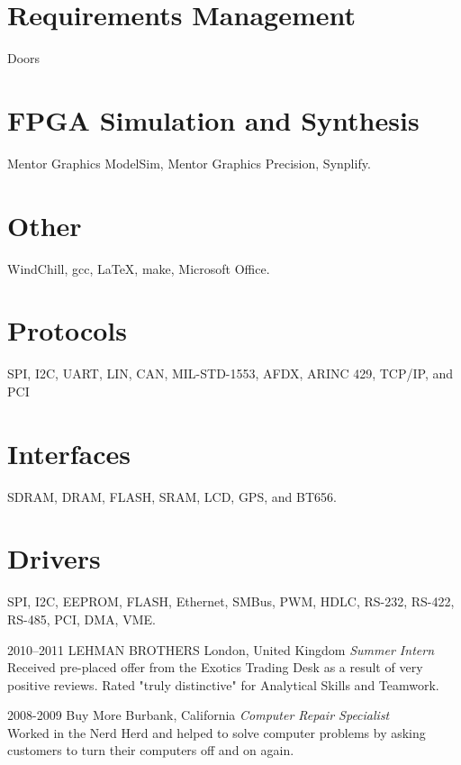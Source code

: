\documentclass[print]{template/friggeri-cv} %
\begin{document}
\begin{aside2} %
\section{Requirements Management}
Doors
\section{FPGA Simulation and Synthesis}
Mentor Graphics ModelSim, Mentor Graphics Precision, Synplify.
\section{Other}
WindChill, gcc, LaTeX, make, Microsoft Office.
\section{Protocols}
SPI, I2C, UART, LIN, CAN, MIL-STD-1553, AFDX, ARINC 429, TCP/IP, and PCI
\section{Interfaces}
SDRAM, DRAM, FLASH, SRAM, LCD, GPS, and BT656.
\section{Drivers}
SPI, I2C, EEPROM, FLASH, Ethernet, SMBus, PWM, HDLC, RS-232, RS-422, RS-485, PCI, DMA, VME.
\end{aside2}

\begin{entrylist}

\entry
{2010--2011}
{LEHMAN BROTHERS}
{London, United Kingdom}
{\emph{Summer Intern} \\
Received pre-placed offer from the Exotics Trading Desk as a result of very positive reviews. Rated "truly distinctive" for Analytical Skills and Teamwork.}


\entry
{2008-2009}
{Buy More}
{Burbank, California}
{\emph{Computer Repair Specialist} \\
Worked in the Nerd Herd and helped to solve computer problems by asking customers to turn their computers off and on again.}


\end{entrylist}
\end{document}
